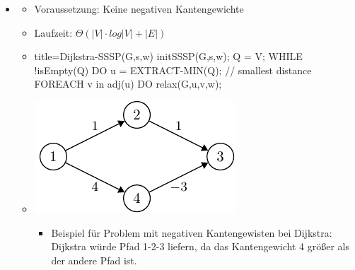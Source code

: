 \documentclass[
    ngerman,
    color=3b,
    dark_mode,
    load_common, %
    summary,
    boxarc,
]{tuda_summary}
\begin{document}
\begin{itemize}
    \item {}
          \begin{itemize}
              \item Voraussetzung: Keine negativen Kantengewichte
              \item Laufzeit: $\Theta(|V| \cdot log|V| + |E|)$
              \item[]%
                    \begin{codeBlock}[autogobble]{title={Dijkstra-SSSP(G,s,w)}}
                    initSSSP(G,s,w);
                    Q = V;
                    WHILE !isEmpty(Q) DO
                        u = EXTRACT-MIN(Q);     // smallest distance
                        FOREACH v in adj(u) DO
                            relax(G,u,v,w);
                    \end{codeBlock}
              \item \begin{minipage}{.3\textwidth}
                        \includegraphics[]{pictures/dijkstra-fail-graph/dijkstra-fail-graph}
                    \end{minipage}
                    \begin{minipage}{.5\textwidth}
                        \begin{itemize}
                            \item Beispiel für Problem mit negativen Kantengewisten bei Dijkstra: Dijkstra würde Pfad 1-2-3 liefern, da das Kantengewicht 4 größer als der andere Pfad ist.
                        \end{itemize}
                    \end{minipage}
          \end{itemize}
\end{itemize}
\clearpage
\end{document}
